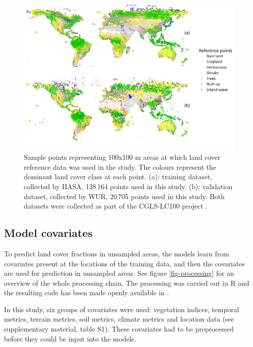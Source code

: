 \documentclass[review,authoryear,3p]{elsarticle}
\begin{document}
\begin{figure}
 \includegraphics[width=\textwidth]{article/article-figures/maps/2020-07-06-training-and-validation}
 \caption{Sample points representing 100x100 m areas at which land cover reference data was used in the study. The colours represent the dominant land cover class at each point. (a): training dataset, collected by \gls{IIASA}, 138\,164 points used in this study. (b): validation dataset, collected by \gls{WUR}, 20\,705 points used in this study. Both datasets were collected as part of the \ac{CGLS-LC100} project \citep{buchhorn_copernicus_2020}.}
 \label{fig-reference-data}
\end{figure}

\subsection{Model covariates}

To predict land cover fractions in unsampled areas, the models learn from covariates present at the locations of the training data, and then the covariates are used for prediction in unsampled areas.
See figure \ref{fig-processing} for an overview of the whole processing chain.
The processing was carried out in R \citep{r_2019} and the resulting code has been made openly available in \citet{dainius_masiliunas_2020_3973123}.

In this study, six groups of covariates were used: vegetation indices, temporal metrics, terrain metrics, soil metrics, climate metrics and location data (see supplementary material, table S1).
These covariates had to be preprocessed before they could be input into the models.
\end{document}
